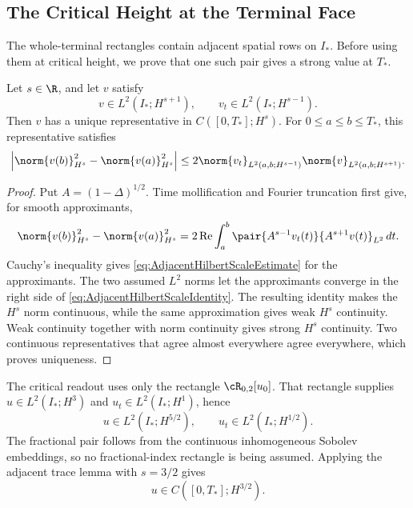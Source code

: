 \subsection{The Critical Height at the Terminal Face}\label{sub:TheCriticalHeightAtTheTerminalFace}

The whole-terminal rectangles contain adjacent spatial rows on \(I_*\).
Before using them at critical height, we prove that one such pair gives a strong value at \(T_*\).

\begin{lemma}\label{lem:AdjacentHilbertScaleTrace}
Let \(s\in\R\), and let \(v\) satisfy
\[
  v\in L^2(I_*;H^{s+1}),
  \qquad
  v_t\in L^2(I_*;H^{s-1}).
\]
Then \(v\) has a unique representative in \(C([0,T_*];H^s)\).
For \(0\leq a\leq b\leq T_*\), this representative satisfies
\begin{equation}\label{eq:AdjacentHilbertScaleEstimate}
  \left|
  \norm{v(b)}_{H^s}^{2}
  -\norm{v(a)}_{H^s}^{2}
  \right|
  \leq
  2\norm{v_t}_{L^2(a,b;H^{s-1})}
  \norm{v}_{L^2(a,b;H^{s+1})}.
\end{equation}
\end{lemma}

\begin{proof}
Put \(A=(1-\Delta)^{1/2}\).
Time mollification and Fourier truncation first give, for smooth approximants,
\begin{equation}\label{eq:AdjacentHilbertScaleIdentity}
  \norm{v(b)}_{H^s}^{2}
  -\norm{v(a)}_{H^s}^{2}
  =
  2\operatorname{Re}\int_a^b
  \pair{A^{s-1}v_t(t)}{A^{s+1}v(t)}_{L^2}
  \,dt.
\end{equation}
Cauchy's inequality gives \eqref{eq:AdjacentHilbertScaleEstimate} for the approximants.
The two assumed \(L^2\) norms let the approximants converge in the right side of \eqref{eq:AdjacentHilbertScaleIdentity}.
The resulting identity makes the \(H^s\) norm continuous, while the same approximation gives weak \(H^s\) continuity.
Weak continuity together with norm continuity gives strong \(H^s\) continuity.
Two continuous representatives that agree almost everywhere agree everywhere, which proves uniqueness.
\end{proof}

The critical readout uses only the rectangle \(\cR_{0,2}[u_0]\).
That rectangle supplies \(u\in L^2(I_*;H^3)\) and \(u_t\in L^2(I_*;H^1)\), hence
\begin{equation}\label{eq:SectionThreeCriticalAdjacentPair}
  u\in L^2(I_*;H^{5/2}),
  \qquad
  u_t\in L^2(I_*;H^{1/2}).
\end{equation}
The fractional pair follows from the continuous inhomogeneous Sobolev embeddings, so no fractional-index rectangle is being assumed.
Applying the adjacent trace lemma with \(s=3/2\) gives
\begin{equation}\label{eq:SectionThreeCriticalVelocityTrace}
  u\in C([0,T_*];H^{3/2}).
\end{equation}

